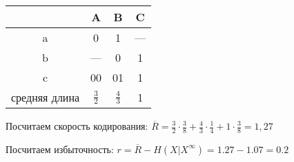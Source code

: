 \begin{tabular}{|c|c|c|c|}
\hline
    & A & B & C\\
\hline
a & 0 & 1 & {---}\\
\hline
b & {---} & 0 & 1\\
\hline
c & 00 & 01 & 1\\
\hline
средняя длина & $\frac{3}{2}$ & $\frac{4}{3}$ & 1\\
\hline
\end{tabular}

Посчитаем скорость кодирования: $\overline{R} = \frac{3}{2} \cdot \frac{3}{8} + \frac{4}{3} \cdot \frac{1}{4} + 1 \cdot \frac{3}{8} = 1,27$

Посчитаем избыточность: $ r = \overline{R} - H(X|X^{\infty}) = 1.27 - 1.07 = 0.2$ 
